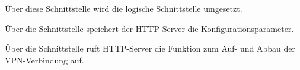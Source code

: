 




Über diese Schnittstelle wird die logische Schnittstelle \lslanhttpmgmt{}
umgesetzt.


Über die Schnittstelle  speichert
der HTTP-Server die Konfigurationsparameter.


Über die Schnittstelle  ruft
HTTP-Server die Funktion zum Auf- und Abbau der VPN-Verbindung auf.


